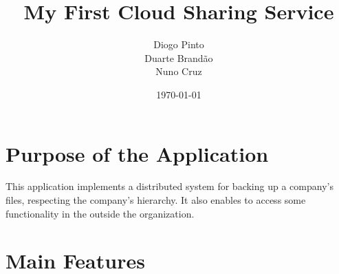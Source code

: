 \documentclass[a4paper]{article}
\title{My First Cloud Sharing Service}
\author{Diogo Pinto \\ Duarte Brandão \\ Nuno Cruz}
\date{\today}
\begin{document}
\maketitle

\section{Purpose of the Application}

This application implements a distributed system for backing up a company's files, respecting the company's hierarchy. 
It also enables to access some functionality in the outside the organization.

\section{Main Features}
\end{document}
